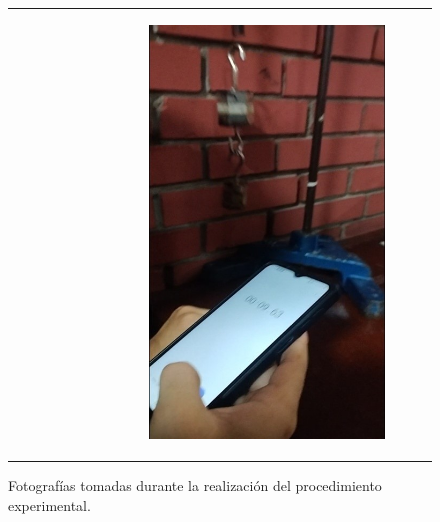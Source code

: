 \documentclass[../main.tex]{subfiles}
\begin{document}
\begin{figure}[H]
\begin{tabular}{c c}
\begin{subfigure}{0.5\linewidth}
            \label{fig:proc3}
        \end{subfigure}&
        \begin{subfigure}{0.5\linewidth}
            \centering
            \includegraphics[width=0.6\linewidth,height=0.6\linewidth]{resources/proc4.jpg}
            \label{fig:proc4}
        \end{subfigure}\\
    \end{tabular}
    \caption{Fotografías tomadas durante la realización del procedimiento experimental.}
    \label{fig:proc_figs}
\end{figure}
\end{document}
